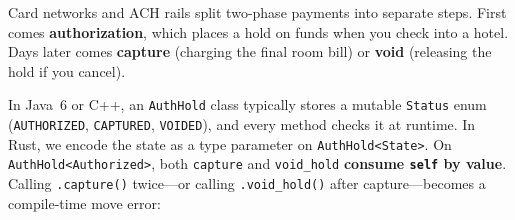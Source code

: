 Card networks and ACH rails split two-phase payments into separate steps. First comes \textbf{authorization}, which places a hold on funds when you check into a hotel. Days later comes \textbf{capture} (charging the final room bill) or \textbf{void} (releasing the hold if you cancel).

In Java~6 or C++, an \texttt{AuthHold} class typically stores a mutable \texttt{Status} enum (\texttt{AUTHORIZED}, \texttt{CAPTURED}, \texttt{VOIDED}), and every method checks it at runtime. In Rust, we encode the state as a type parameter on \texttt{AuthHold<State>}. On \texttt{AuthHold<Authorized>}, both \texttt{capture} and \texttt{void\_hold} \textbf{consume \texttt{self} by value}. Calling \texttt{.capture()} twice---or calling \texttt{.void\_hold()} after capture---becomes a compile-time move error:

